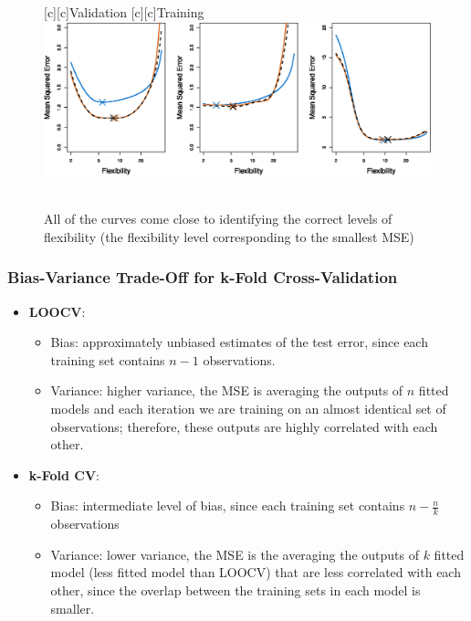\documentclass[12pt,a4paper]{article}%
\theoremstyle{definition}
\theoremstyle{plain}
\numberwithin{equation}{section}
\begin{document}
\begin{figure}[H]
\centering
{}[c][c]{Validation}
[c][c]{Training}
\includegraphics[scale=0.8]{images//5_6.eps}
\\~\\
\caption{All of the curves come close to identifying the correct levels of flexibility (the flexibility level corresponding to the smallest MSE)}\label{figure-5.6}
\end{figure}

\subsubsection{\textbf{Bias-Variance Trade-Off for k-Fold Cross-Validation}}
\begin{itemize}
\item \textbf{LOOCV}:
	\begin{itemize}
	\item Bias: approximately unbiased estimates of the test error, since each training set contains $n-1$ observations.
	\item Variance: higher variance, the MSE is averaging the outputs of $n$ fitted models and each iteration we are training on an almost identical set of observations; therefore, these outputs are highly correlated with each other.
	\end{itemize}
\end{itemize}

\begin{itemize}
\item \textbf{k-Fold CV}:
	\begin{itemize}
	\item Bias: intermediate level of bias, since each training set contains $n-\frac{n}{k}$ observations
	\item Variance: lower variance, the MSE is the averaging the outputs of $k$ fitted model (less fitted model than LOOCV) that are less correlated with each other, since the overlap between the training sets in each model is smaller.
	\end{itemize}
\end{itemize}
\end{document}
